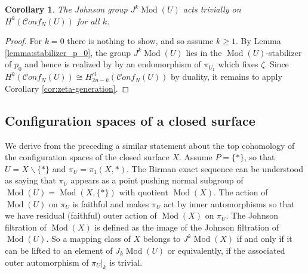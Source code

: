 \documentclass[12pt,letterpaper]{amsart}
\numberwithin{equation}{section}
\def\ssm{\smallsetminus}
\newcommand\conf{\mathscr{C}\!\mathit{onf}\!}
\newcommand\Mod{\operatorname{Mod}}
\newtheorem{corollary}[theorem]{Corollary}
\theoremstyle{remark}
\begin{document}
\begin{corollary}\label{cor:johnsonkernel}
The Johnson group $J^k\Mod(U)$ acts trivially  on $H^k(\conf_N(U))$ for all $k$.
\end{corollary}
\begin{proof}
For $k=0$ there is nothing to show, and so assume $k\ge 1$. By Lemma \ref{lemma:stabilizer_p_0}, the group  $J^k\Mod(U)$ {lies in} the $\Mod(U)$-stabilizer of $p_0$ and  hence is realized by by an endomorphism of $\pi_{U_1}$ which fixes $\zeta$. Since $H^k(\conf_N(U))\cong 
H^{cl}_{2n-k}(\conf_N(U))$ by duality,  it remains to apply Corollary  \ref{cor:zeta-generation}.
\end{proof}





\subsection{Configuration spaces of a closed surface} We derive from the preceding a similar statement about the top cohomology of the configuration spaces of the  closed surface $X$. 
Assume $P=\{*\}$, so that  $U=X\ssm \{*\}$ and $\pi_U=\pi_1(X,*)$. The Birman exact sequence can be understood as saying that $\pi_U$ appears as a point pushing normal subgroup of $\Mod(U)=\Mod(X, \{*\})$ with quotient $\Mod(X)$.  The  action of $\Mod(U)$  on $\pi_U$ is faithful and makes $\pi_U$ act by inner automorphisms so that we have  residual (faithful) outer action  of  $\Mod(X)$ on $\pi_U$.
The Johnson filtration of  $\Mod(X)$ is defined as the image of the Johnson filtration of $\Mod(U)$. So  a mapping class of $X$ belongs to $J^k\Mod(X)$ if and only if  it can be lifted to an  element of  $J_k\Mod(U)$ or equivalently, if  the associated outer automorphism of $\pi_U|_k$ is trivial.
\end{document}

